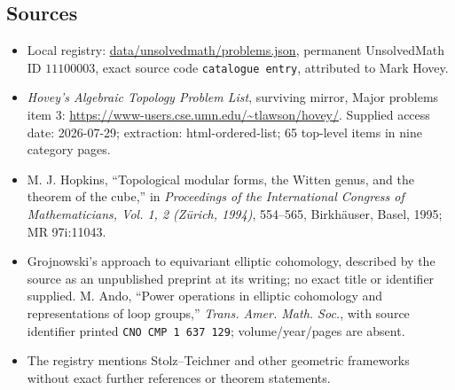 \documentclass[11pt]{article}
\begin{document}
\subsection{Sources}
\begin{itemize}
\item Local registry: \url{data/unsolvedmath/problems.json}, permanent UnsolvedMath ID $11100003$, exact source code \texttt{catalogue entry}, attributed to Mark Hovey.
\item \emph{Hovey's Algebraic Topology Problem List}, surviving mirror, Major problems item 3: \url{https://www-users.cse.umn.edu/~tlawson/hovey/}. Supplied access date: 2026-07-29; extraction: html-ordered-list; 65 top-level items in nine category pages.
\item M. J. Hopkins, ``Topological modular forms, the Witten genus, and the theorem of the cube,'' in \emph{Proceedings of the International Congress of Mathematicians, Vol. 1, 2 (Z\"urich, 1994)}, 554--565, Birkh\"auser, Basel, 1995; MR 97i:11043.
\item Grojnowski's approach to equivariant elliptic cohomology, described by the source as an unpublished preprint at its writing; no exact title or identifier supplied. M. Ando, ``Power operations in elliptic cohomology and representations of loop groups,'' \emph{Trans. Amer. Math. Soc.}, with source identifier printed \texttt{CNO CMP 1 637 129}; volume/year/pages are absent.
\item The registry mentions Stolz--Teichner and other geometric frameworks without exact further references or theorem statements.
\end{itemize}
\end{document}
